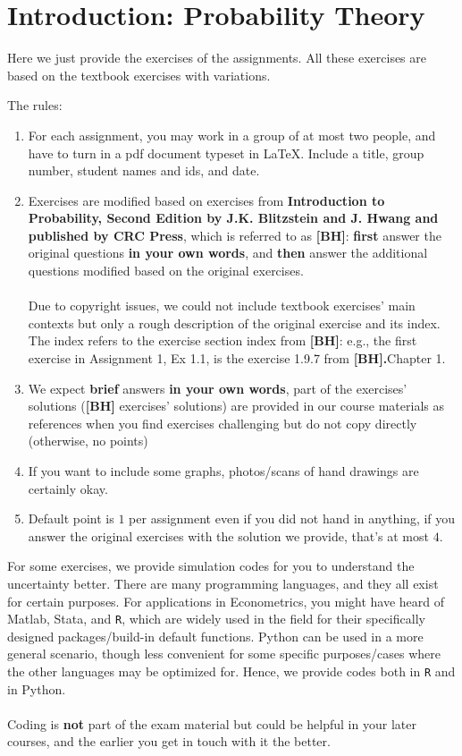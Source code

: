 \section*{Introduction: Probability Theory}

Here we just provide the exercises of the assignments. All these exercises are based on the textbook exercises with variations. 


The rules:
\begin{enumerate}
	\item For each assignment, you may work in a group of at most two people, and have to turn in a pdf document typeset in \LaTeX{}. Include a title, group number, student names and ids, and date.
	\item Exercises are modified based on exercises from \textbf{Introduction to Probability, Second Edition by J.K. Blitzstein and J. Hwang and published by CRC Press}, which is referred to as \textbf{[BH]}: \textbf{first} answer the original questions \textbf{in your own words}, and \textbf{then} answer the additional questions modified based on the original exercises.\\~\\ 
	Due to copyright issues, we could not include textbook exercises' main contexts but only a rough description of the original exercise and its index. The index refers to the exercise section index from \textbf{[BH]}: e.g., the first exercise in Assignment 1, Ex 1.1, is the exercise 1.9.7 from  \textbf{[BH].}Chapter 1. 
	\item 
	We expect \textbf{brief} answers \textbf{in your own words}, part of the exercises' solutions (\textbf{[BH]} exercises' solutions)  are provided in our course materials as references when you find exercises challenging but do not copy directly (otherwise, no points)
	\item If you want to include some graphs, photos/scans of hand drawings are certainly okay.
	\item Default point is $1$ per assignment even if you did not hand in anything, if you answer the original exercises with the solution we provide, that's at most $4$. 
\end{enumerate}

For some exercises, we provide simulation codes for you to understand the uncertainty better. There are many programming languages, and they all exist for certain purposes. For applications in Econometrics,  you might have heard of Matlab, Stata, and \texttt{R}, which are widely used in the field for their specifically designed packages/build-in default functions. Python can be used in a more general scenario,  though less convenient for some specific purposes/cases where the other languages may be optimized for. Hence, we provide codes both in \texttt{R} and in Python.\\~\\ 
Coding is \textbf{not} part of the exam material but could be helpful in your later courses, and the earlier you get in touch with it the better.  